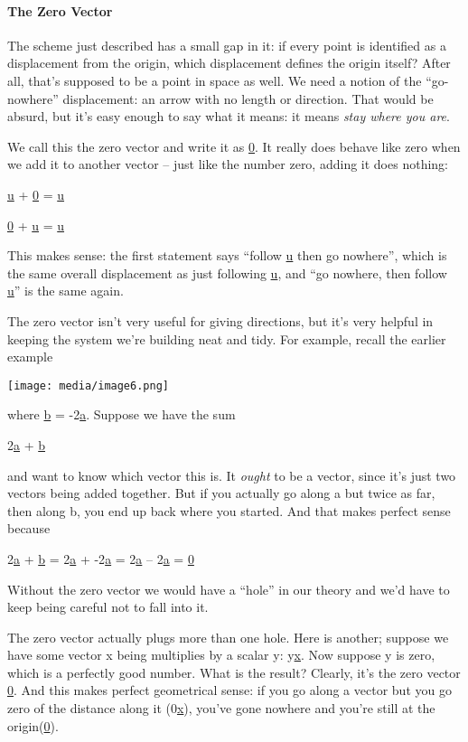 \documentclass[oneside,english]{amsbook}
\numberwithin{section}{chapter}
\theoremstyle{plain}
\theoremstyle{definition}
\begin{document}
\paragraph{The Zero Vector}

The scheme just described has a small gap in it: if every point is
identified as a displacement from the origin, which displacement defines
the origin itself? After all, that's supposed to be a point in space as
well. We need a notion of the ``go-nowhere'' displacement: an arrow with
no length or direction. That would be absurd, but it's easy enough to
say what it means: it means \emph{stay where you are}.

We call this the zero vector and write it as \ul{0}. It really does
behave like zero when we add it to another vector -- just like the
number zero, adding it does nothing:

\ul{u} + \ul{0} = \ul{u}

\ul{0} + \ul{u} = \ul{u}

This makes sense: the first statement says ``follow \ul{u} then go
nowhere'', which is the same overall displacement as just following
\ul{u}, and ``go nowhere, then follow \ul{u}'' is the same again.

The zero vector isn't very useful for giving directions, but it's very
helpful in keeping the system we're building neat and tidy. For example,
recall the earlier example

\texttt{[image: media/image6.png]}

where \ul{b} = -2\ul{a}. Suppose we have the sum

2\ul{a} + \ul{b}

and want to know which vector this is. It \emph{ought} to be a vector,
since it's just two vectors being added together. But if you actually go
along a but twice as far, then along b, you end up back where you
started. And that makes perfect sense because

2\ul{a} + \ul{b} = 2\ul{a} + -2\ul{a} = 2\ul{a} -- 2\ul{a} = \ul{0}

Without the zero vector we would have a ``hole'' in our theory and we'd
have to keep being careful not to fall into it.

The zero vector actually plugs more than one hole. Here is another;
suppose we have some vector x being multiplies by a scalar y: y\ul{x}.
Now suppose y is zero, which is a perfectly good number. What is the
result? Clearly, it's the zero vector \ul{0}. And this makes perfect
geometrical sense: if you go along a vector but you go zero of the
distance along it (0\ul{x}), you've gone nowhere and you're still at the
origin(\ul{0}).
\end{document}
